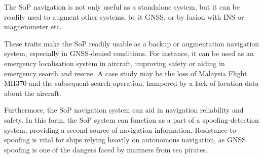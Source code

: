 The SoP navigation is not only useful as a standalone system, but it can be readily used to augment other systems, be it GNSS, or by fusion with INS or magnetometer etc.

These traits make the SoP readily usable as a backup or augmentation navigation system, especially in GNSS-denied conditions.  For instance, it can be used as an emergency localisation system in aircraft, improving safety or aiding in emergency search and rescue. A case study may be the loss of Malaysia Flight MH370 and the subsequent search operation, hampered by a lack of location data about the aircraft\cite{sop13}.

Furthermore, the SoP navigation system can aid in navigation reliability and safety. In this form, the SoP system can function as a part of a spoofing-detection system, providing a second source of navigation information. Resistance to spoofing is vital for ships relying heavily on autonomous navigation, as GNSS spoofing is one of the dangers faced by mariners from sea pirates\cite{int03}.

